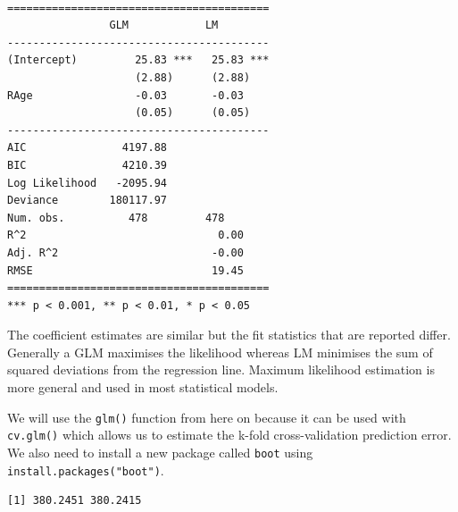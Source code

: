 \documentclass[]{article}
\newenvironment{Shaded}{\begin{snugshade}}{\end{snugshade}}
\newcommand{\CommentTok}[1]{\textcolor[rgb]{0.56,0.35,0.01}{\textit{#1}}}
\newcommand{\KeywordTok}[1]{\textcolor[rgb]{0.13,0.29,0.53}{\textbf{#1}}}
\newcommand{\NormalTok}[1]{#1}
\newcommand{\OperatorTok}[1]{\textcolor[rgb]{0.81,0.36,0.00}{\textbf{#1}}}
\newcommand{\StringTok}[1]{\textcolor[rgb]{0.31,0.60,0.02}{#1}}
\begin{document}
\begin{verbatim}

=========================================
                GLM            LM        
-----------------------------------------
(Intercept)         25.83 ***   25.83 ***
                    (2.88)      (2.88)   
RAge                -0.03       -0.03    
                    (0.05)      (0.05)   
-----------------------------------------
AIC               4197.88                
BIC               4210.39                
Log Likelihood   -2095.94                
Deviance        180117.97                
Num. obs.          478         478       
R^2                              0.00    
Adj. R^2                        -0.00    
RMSE                            19.45    
=========================================
*** p < 0.001, ** p < 0.01, * p < 0.05
\end{verbatim}

The coefficient estimates are similar but the fit statistics that are reported differ. Generally a GLM maximises the likelihood whereas LM minimises the sum of squared deviations from the regression line. Maximum likelihood estimation is more general and used in most statistical models.

We will use the \texttt{glm()} function from here on because it can be used with \texttt{cv.glm()} which allows us to estimate the k-fold cross-validation prediction error. We also need to install a new package called \texttt{boot} using \texttt{install.packages("boot")}.

\begin{Shaded}
\end{Shaded}

\begin{verbatim}
[1] 380.2451 380.2415
\end{verbatim}

\begin{Shaded}
\end{Shaded}
\end{document}
